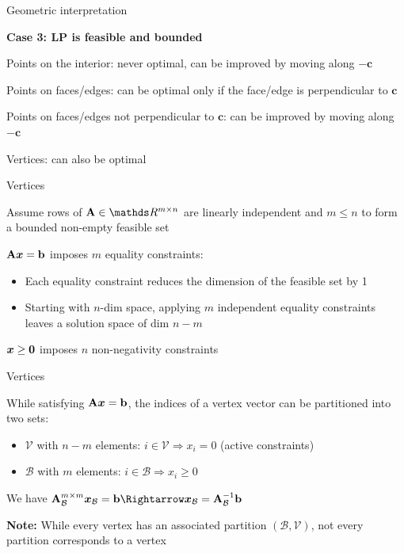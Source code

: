 \documentclass[11pt,compress,t,notes=noshow, xcolor=table]{beamer}
\begin{document}
\begin{framei}{Geometric interpretation}
\item[] \textbf{Case 3: LP is feasible and bounded}
\item Points on the interior: never optimal, can be improved by moving along $-\mathbf{c}$
\item Points on faces/edges: can be optimal only if the face/edge is perpendicular to $\mathbf{c}$
\item Points on faces/edges not perpendicular to $\mathbf{c}$: can be improved by moving along $-\mathbf{c}$
\item Vertices: can also be optimal
\vfill
{}
\end{framei}


\begin{framei}[sep=L]{Vertices}
\item Assume rows of $\Amat \in \R^{m \times n}$ are linearly independent and $m \le n$ to form a bounded non-empty feasible set
\item $\mathbf{A}\bm{x} = \mathbf{b}$ imposes $m$ equality constraints:
\begin{itemize}
\item Each equality constraint reduces the dimension of the feasible set by 1
\item Starting with $n$-dim space, applying $m$ independent equality constraints leaves a solution space of dim $n-m$
\end{itemize}
\item $\bm{x} \ge \mathbf{0}$ imposes $n$ non-negativity constraints
\end{framei}


\begin{framei}[sep=L]{Vertices}
\item While satisfying $\mathbf{A}\bm{x} = \mathbf{b}$, the indices of a vertex vector can be partitioned into two sets:
\begin{itemize}
\item $\mathcal{V}$ with $n-m$ elements: $i \in \mathcal{V} \Rightarrow x_i = 0$ (active constraints)
\item $\mathcal{B}$ with $m$ elements: $i \in \mathcal{B} \Rightarrow x_i \ge 0$
\end{itemize}
\item We have $\Amat_{\mathcal{B}}^{m\times m}\xv_{\mathcal{B}} = \mathbf{b} \Rightarrow \xv_{\mathcal{B}} = \Amat_{\mathcal{B}}^{-1}\mathbf{b}$
\vfill
\item \textbf{Note:} While every vertex has an associated partition $(\mathcal{B}, \mathcal{V})$, not every partition corresponds to a vertex
\end{framei}
\end{document}

